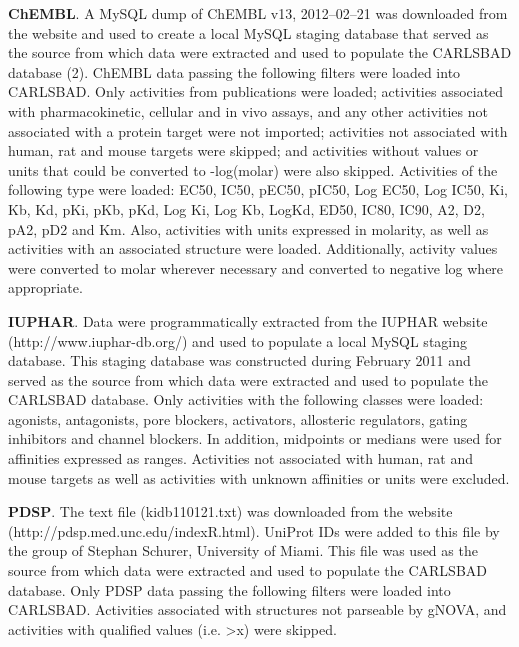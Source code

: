 \textbf{ChEMBL}. A MySQL dump of ChEMBL v13, 2012–02–21 was downloaded from the website and used to create a local MySQL staging database that served as the source from which data were extracted and used to populate the CARLSBAD database (2). ChEMBL data passing the following filters were loaded into CARLSBAD. Only activities from publications were loaded; activities associated with pharmacokinetic, cellular and in vivo assays, and any other activities not associated with a protein target were not imported; activities not associated with human, rat and mouse targets were skipped; and activities without values or units that could be converted to -log(molar) were also skipped. Activities of the following type were loaded: EC50, IC50, pEC50, pIC50, Log EC50, Log IC50, Ki, Kb, Kd, pKi, pKb, pKd, Log Ki, Log Kb, LogKd, ED50, IC80, IC90, A2, D2, pA2, pD2 and Km. Also, activities with units expressed in molarity, as well as activities with an associated structure were loaded. Additionally, activity values were converted to molar wherever necessary and converted to negative log where appropriate.

\textbf{IUPHAR}. Data were programmatically extracted from the IUPHAR website (http://www.iuphar-db.org/) and used to populate a local MySQL staging database. This staging database was constructed during February 2011 and served as the source from which data were extracted and used to populate the CARLSBAD database. Only activities with the following classes were loaded: agonists, antagonists, pore blockers, activators, allosteric regulators, gating inhibitors and channel blockers. In addition, midpoints or medians were used for affinities expressed as ranges. Activities not associated with human, rat and mouse targets as well as activities with unknown affinities or units were excluded.

\textbf{PDSP}. The text file (kidb110121.txt) was downloaded from the website (http://pdsp.med.unc.edu/indexR.html). UniProt IDs were added to this file by the group of Stephan Schurer, University of Miami. This file was used as the source from which data were extracted and used to populate the CARLSBAD database. Only PDSP data passing the following filters were loaded into CARLSBAD. Activities associated with structures not parseable by gNOVA, and activities with qualified values (i.e. >x) were skipped.

